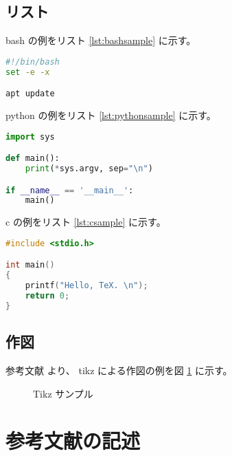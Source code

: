 \documentclass[a4paper]{ltjsarticle}
\begin{document}
\subsection{リスト}

bash の例をリスト \ref{lst:bashsample} に示す。

\begin{lstlisting}[caption = Bash 例, label = lst:bashsample, language=bash]
#!/bin/bash
set -e -x

apt update
\end{lstlisting}

python の例をリスト \ref{lst:pythonsample} に示す。

\begin{lstlisting}[caption = Python ソースコード例, label = lst:pythonsample, language=python]
import sys

def main():
    print(*sys.argv, sep="\n")

if __name__ == '__main__':
    main()
\end{lstlisting}

c の例をリスト \ref{lst:csample} に示す。

\begin{lstlisting}[caption = C ソースコード例, label = lst:csample, language=c]
#include <stdio.h>

int main()
{
	printf("Hello, TeX. \n");
	return 0;
}
\end{lstlisting}


\subsection{作図}

参考文献 \cite{bib:tikzsample} より、
tikz による作図の例を図 \ref{fig:tikzsample} に示す。

\begin{figure}[htbp]
\centering
{}
\caption{Tikz サンプル}
\label{fig:tikzsample}
\end{figure}


\newpage
\section{参考文献の記述}
\end{document}
